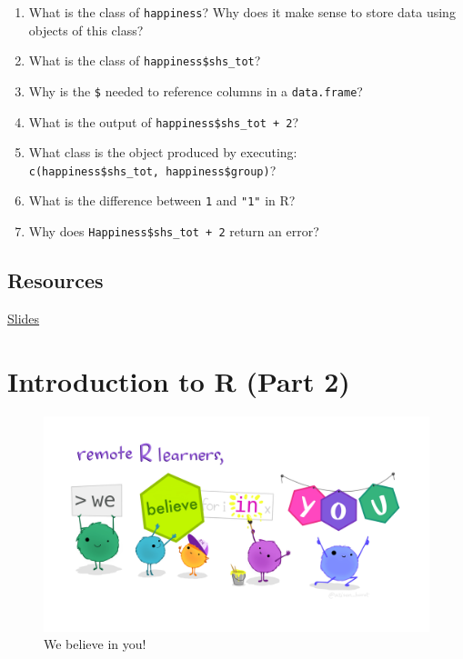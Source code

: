 \documentclass[
]{book}
\providecommand{\tightlist}{%
  \setlength{\itemsep}{0pt}\setlength{\parskip}{0pt}}
\begin{document}
\begin{enumerate}
\def\labelenumi{\arabic{enumi}.}
\tightlist
\item
  What is the class of \texttt{happiness}? Why does it make sense to store data using objects of this class?
\item
  What is the class of \texttt{happiness\$shs\_tot}?
\item
  Why is the \texttt{\$} needed to reference columns in a \texttt{data.frame}?
\item
  What is the output of \texttt{happiness\$shs\_tot\ +\ 2}?
\item
  What class is the object produced by executing: \texttt{c(happiness\$shs\_tot,\ happiness\$group)}?
\item
  What is the difference between \texttt{1} and \texttt{"1"} in R?
\item
  Why does \texttt{Happiness\$shs\_tot\ +\ 2} return an error?
\end{enumerate}

\hypertarget{resources}{%
\section{Resources}\label{resources}}

\href{assets/slides/01-intro-to-r-1-slides.pdf}{Slides}

\hypertarget{intro2}{%
\chapter{Introduction to R (Part 2)}\label{intro2}}

\begin{figure}
\centering
\includegraphics{assets/images/monster_support.jpg}
\caption{We believe in you!}
\end{figure}
\end{document}
